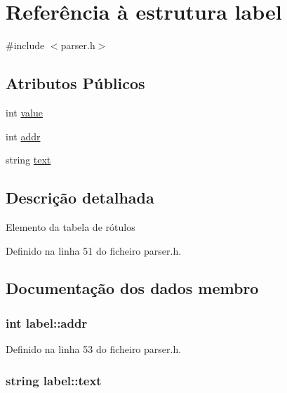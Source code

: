 \hypertarget{structlabel}{\section{Referência à estrutura label}
\label{structlabel}
}


{\ttfamily \#include $<$parser.\-h$>$}

\subsection*{Atributos Públicos}
\begin{DoxyCompactItemize}
\item 
int \hyperlink{structlabel_ac0cdaf20932b7fe75988a1d08510b72c}{value}
\item 
int \hyperlink{structlabel_af670c52b4f6b3aeaadc0ec95334e6e52}{addr}
\item 
string \hyperlink{structlabel_a119fc486bd92631742a9fe2cf278d4df}{text}
\end{DoxyCompactItemize}


\subsection{Descrição detalhada}
Elemento da tabela de rótulos 

Definido na linha 51 do ficheiro parser.\-h.



\subsection{Documentação dos dados membro}
\hypertarget{structlabel_af670c52b4f6b3aeaadc0ec95334e6e52}{
\subsubsection[{addr}]{\setlength{\rightskip}{0pt plus 5cm}int label\-::addr}}\label{structlabel_af670c52b4f6b3aeaadc0ec95334e6e52}


Definido na linha 53 do ficheiro parser.\-h.

\hypertarget{structlabel_a119fc486bd92631742a9fe2cf278d4df}{
\subsubsection[{text}]{\setlength{\rightskip}{0pt plus 5cm}string label\-::text}}\label{structlabel_a119fc486bd92631742a9fe2cf278d4df}


